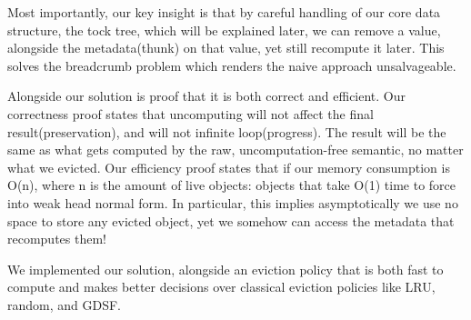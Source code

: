 Most importantly, our key insight is that by careful handling of our core data structure, the tock tree, which will be explained later, we can remove a value, alongside the metadata(thunk) on that value, yet still recompute it later. This solves the breadcrumb problem which renders the naive approach unsalvageable.

Alongside our solution is proof that it is both correct and efficient. Our correctness proof states that uncomputing will not affect the final result(preservation), and will not infinite loop(progress). The result will be the same as what gets computed by the raw, uncomputation-free semantic, no matter what we evicted. Our efficiency proof states that if our memory consumption is O(n), where n is the amount of live objects: objects that take O(1) time to force into weak head normal form. In particular, this implies asymptotically we use no space to store any evicted object, yet we somehow can access the metadata that recomputes them!

We implemented our solution, alongside an eviction policy that is both fast to compute and makes better decisions over classical eviction policies like LRU, random, and GDSF.
